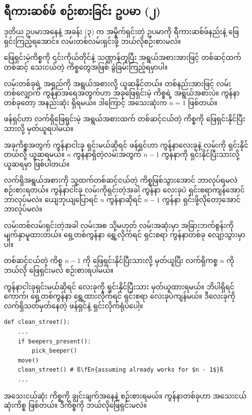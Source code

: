 \subsection*{ရီကားဆစ်ဖ် စဉ်းစားခြင်း ဥပမာ (၂)}
ဒုတိယ ဥပမာအနေနဲ့ အခန်း (၃) က အမှိုက်ရှင်းတဲ့ ဥပမာကို ရီကားဆစ်ဖ်နည်းနဲ့ ဖြေရှင်းကြည့်ရအောင်။ လမ်းတစ်လမ်းရှင်းဖို့ ဘယ်လိုစဉ်းစားမလဲ။
\begin{mytcbox}
ဖြေရှင်းမဲ့ကိစ္စကို ၎င်းကိုယ်တိုင်နဲ့ သဏ္ဌာန်တူပြီး အရွယ်အစားအားဖြင့် တစ်ဆင့်ထက်တစ်ဆင့် သေးငယ်တဲ့ ကိစ္စတွေအဖြစ် ခွဲခြမ်းကြည့်ရမှာပါ။
\end{mytcbox}%

လမ်းတစ်ခုရဲ့ အရှည်ကို အရွယ်အစားလို့ ယူဆနိုင်တယ်။ တစ်နည်းအားဖြင့် လမ်းတစ်လျှောက် ကွန်နာအရေအတွက်ဟာ အခုဖြေရှင်းမဲ့ ကိစ္စရဲ့ အရွယ်အစားပဲ။ ကွန်နာတစ်ခုတော့ အနည်းဆုံး ရှိရမယ်။ ဒါကြောင့် အသေးဆုံးက $n = 1$ ဖြစ်တယ်။

\begin{mytcbox}
 ဖန်ရှင်ဟာ လက်ရှိဖြေရှင်းမဲ့ အရွယ်အစားထက် တစ်ဆင့်ငယ်တဲ့ ကိစ္စကို ဖြေရှင်းနိုင်ပြီးသားလို့ မှတ်ယူရပါမယ်။ 
\end{mytcbox}%

အခုကိစ္စအတွက် ကွန်နာငါးခု ရှင်းမယ်ဆိုရင်  ဖန်ရှင်ဟာ ကွန်နာလေးခုနဲ့ လမ်းကို ရှင်းနိုင်တယ်လို့ ယူဆရမယ်။  $n$ ကွန်နာရှိတဲ့လမ်းအတွက် $n - 1$ ကွန်နာကို ရှင်းနိုင်ပြီးသားလို့ ယူဆရမှာ ဖြစ်ပါတယ်။


\begin{mytcbox}
လက်ရှိအရွယ်အစားကို သူ့ထက်တစ်ဆင့်ငယ်တဲ့ ကိစ္စဖြစ်သွားအောင် ဘာလုပ်ရမလဲ စဉ်းစားရတယ်။ ကွန်နာငါးခု လမ်းကိုရှင်းတဲ့အခါ ကွန်နာ လေးခုပဲ ရှင်းစရာကျန်အောင် ဘာလုပ်မလဲ။ ယျေဘုယျပြောရင် $n$ ကွန်နာဆိုရင် $n - 1$ ကွန်နာ ရှင်းဖို့လိုတော့အောင် ဘာလုပ်မလဲ။ 
\end{mytcbox}%

လမ်းတစ်လမ်းရှင်းတဲ့အခါ လမ်းအစ သို့မဟုတ် လမ်းအဆုံးမှာ အခြားဘက်စွန်းကို  မျက်နှာမူထားတယ်။ ရှေ့တစ်ကွန်နာ ရွှေ့လိုက်ရင်  ရှင်းစရာ ကွန်နာတစ်ခု လျော့သွားမှာပါ။

\begin{mytcbox}
တစ်ဆင့်ငယ်တဲ့ ကိစ္စ $n - 1$ ကို ဖြေရှင်းနိုင်ပြီးသားလို့ မှတ်ယူပြီး လက်ရှိကစ္စ $n$ ကို ဘယ်လို ဖြေရှင်းမလဲ စဉ်းစားရပါမယ်။
\end{mytcbox}%

ကွန်နာငါးခုရှင်းမယ်ဆိုရင် လေးခုကို ရှင်းနိုင်ပြီးသား မှတ်ယူထားရမယ်။ ဘိပါရှိရင်ကောက်၊ ရှေ့တစ်ကွန်နာ ရွှေ့ထားလိုက်ရင် ရှင်းစရာ လေးခုပဲကျန်မယ်။ ဒီလေးခုကို လက်ရှိသတ်မှတ်နေတဲ့ ဖန်ရှင်နဲ့ ရှင်းလိုက်ရုံပဲပေါ့။
%
\setlength{\fboxsep}{0pt}
\begin{verbatim}
def clean_street():
    ...
    if beepers_present():
        pick_beeper()
    move()
    clean_street() # ‌ß\fEn{assuming already works for $n - 1$}ß
    ...
\end{verbatim}
%
\begin{mytcbox}
    အသေးငယ်ဆုံး ကိစ္စကို ချွင်းချက်အနေနဲ့ စဉ်းစားရမယ်။   ကွန်နာတစ်ခုဟာ အသေးငယ်ဆုံးကိစ္စ ဖြစ်တယ်။ ဒီကိစ္စကို ဘယ်လိုဖြေရှင်းမလဲ။
\end{mytcbox}

